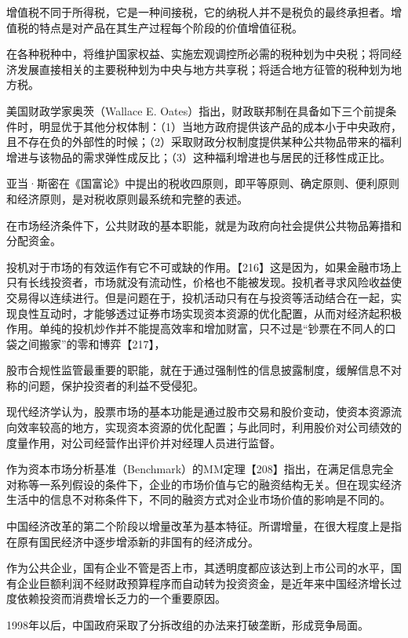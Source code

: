 \begin{itemize*}
	\item 增值税不同于所得税，它是一种间接税，它的纳税人并不是税负的最终承担者。增值税的特点是对产品在其生产过程每个阶段的价值增值征税。
	\item 在各种税种中，将维护国家权益、实施宏观调控所必需的税种划为中央税；将同经济发展直接相关的主要税种划为中央与地方共享税；将适合地方征管的税种划为地方税。
	\item 美国财政学家奥茨（Wallace E. Oates）指出，财政联邦制在具备如下三个前提条件时，明显优于其他分权体制：（1）当地方政府提供该产品的成本小于中央政府，且不存在负的外部性的时候；（2）采取财政分权制度提供某种公共物品带来的福利增进与该物品的需求弹性成反比；（3）这种福利增进也与居民的迁移性成正比。
	\item 亚当·斯密在《国富论》中提出的税收四原则，即平等原则、确定原则、便利原则和经济原则，是对税收原则最系统和完整的表述。
	\item 在市场经济条件下，公共财政的基本职能，就是为政府向社会提供公共物品筹措和分配资金。
	\item 投机对于市场的有效运作有它不可或缺的作用。【216】这是因为，如果金融市场上只有长线投资者，市场就没有流动性，价格也不能被发现。投机者寻求风险收益使交易得以连续进行。但是问题在于，投机活动只有在与投资等活动结合在一起，实现良性互动时，才能够透过证券市场实现资本资源的优化配置，从而对经济起积极作用。单纯的投机炒作并不能提高效率和增加财富，只不过是“钞票在不同人的口袋之间搬家”的零和博弈【217】，
	\item 股市合规性监管最重要的职能，就在于通过强制性的信息披露制度，缓解信息不对称的问题，保护投资者的利益不受侵犯。
	\item 现代经济学认为，股票市场的基本功能是通过股市交易和股价变动，使资本资源流向效率较高的地方，实现资本资源的优化配置；与此同时，利用股价对公司绩效的度量作用，对公司经营作出评价并对经理人员进行监督。
	\item 作为资本市场分析基准（Benchmark）的MM定理【208】指出，在满足信息完全对称等一系列假设的条件下，企业的市场价值与它的融资结构无关。但在现实经济生活中的信息不对称条件下，不同的融资方式对企业市场价值的影响是不同的。
	\item 中国经济改革的第二个阶段以增量改革为基本特征。所谓增量，在很大程度上是指在原有国民经济中逐步增添新的非国有的经济成分。
	\item 作为公共企业，国有企业不管是否上市，其透明度都应该达到上市公司的水平，国有企业巨额利润不经财政预算程序而自动转为投资资金，是近年来中国经济增长过度依赖投资而消费增长乏力的一个重要原因。
	\item 1998年以后，中国政府采取了分拆改组的办法来打破垄断，形成竞争局面。

\end{itemize*}
